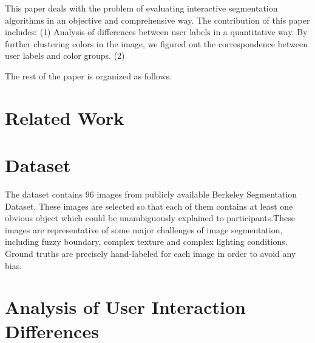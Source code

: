 \documentclass[runningheads,a4paper]{llncs}
\begin{document}


This paper deals with the problem of evaluating interactive segmentation algorithms in an objective and comprehensive way. The contribution of this paper includes: (1)  Analysis of differences between user labels in a quantitative way. By further clustering colors in the image, we figured out the correspondence between user labels and color groups. (2)

The rest of the paper is organized as follows.

\section{Related Work}



\section{Dataset}
The dataset contains 96 images from publicly available Berkeley Segmentation Dataset\citep{martin2001database}. These images are selected so that each of them contains at least one obvious object which could be unambiguously explained to participants.These images are representative of some major challenges of image segmentation, including fuzzy boundary, complex texture and complex lighting conditions. Ground truths are precisely hand-labeled for each image in order to avoid any bias.


\section{Analysis of User Interaction Differences}
\end{document}

